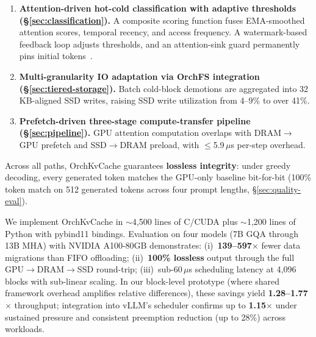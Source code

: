 \documentclass[conference]{IEEEtran}
\begin{document}
\begin{enumerate}
\item \textbf{Attention-driven hot-cold classification with adaptive thresholds (\S\ref{sec:classification}).} A composite scoring function fuses EMA-smoothed attention scores, temporal recency, and access frequency. A watermark-based feedback loop adjusts thresholds, and an attention-sink guard permanently pins initial tokens~\cite{streamingllm}.

\item \textbf{Multi-granularity IO adaptation via OrchFS integration (\S\ref{sec:tiered-storage}).} Batch cold-block demotions are aggregated into 32\,KB-aligned SSD writes, raising SSD write utilization from 4--9\% to over 41\%.

\item \textbf{Prefetch-driven three-stage compute-transfer pipeline (\S\ref{sec:pipeline}).} GPU attention computation overlaps with DRAM$\to$GPU prefetch and SSD$\to$DRAM preload, with $\leq$5.9\,$\mu$s per-step overhead.
\end{enumerate}

Across all paths, OrchKvCache guarantees \textbf{lossless integrity}: under greedy decoding, every generated token matches the GPU-only baseline bit-for-bit (100\% token match on 512 generated tokens across four prompt lengths, \S\ref{sec:quality-eval}).

We implement OrchKvCache in ${\sim}$4,500 lines of C/CUDA plus ${\sim}$1,200 lines of Python with pybind11 bindings. Evaluation on four models (7B GQA through 13B MHA) with NVIDIA A100-80GB demonstrates: (i)~\textbf{139--597$\times$} fewer data migrations than FIFO offloading; (ii)~\textbf{100\% lossless} output through the full GPU$\to$DRAM$\to$SSD round-trip; (iii)~sub-60\,$\mu$s scheduling latency at 4,096 blocks with sub-linear scaling. In our block-level prototype (where shared framework overhead amplifies relative differences), these savings yield \textbf{1.28--1.77$\times$} throughput; integration into vLLM's scheduler confirms up to \textbf{1.15$\times$} under sustained pressure and consistent preemption reduction (up to 28\%) across workloads.
\end{document}
